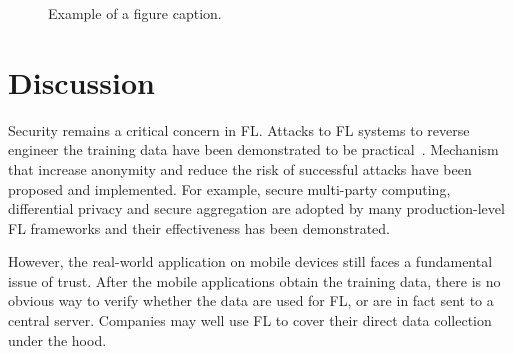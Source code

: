 \documentclass[conference]{IEEEtran}
\begin{document}
\begin{figure}[htbp]
\centerline{
}
\caption{Example of a figure caption.}
\label{fig}
\end{figure}

\section{Discussion}


Security remains a critical concern in FL.
Attacks to FL systems to reverse engineer the training data have been
demonstrated to be practical~\cite{sun2019really}.
Mechanism that increase anonymity and
reduce the risk of successful attacks have been proposed and implemented.
For example, secure multi-party computing,
differential privacy and secure aggregation are
adopted by many production-level FL frameworks and
their effectiveness has been demonstrated.

However, the real-world application on mobile devices still faces a fundamental
issue of trust.
After the mobile applications obtain the training data,
there is no obvious way to verify whether the data are used for FL,
or are in fact sent to a central server.
Companies may well use FL to cover their direct data collection under the hood.

\printbibliography

\end{document}
